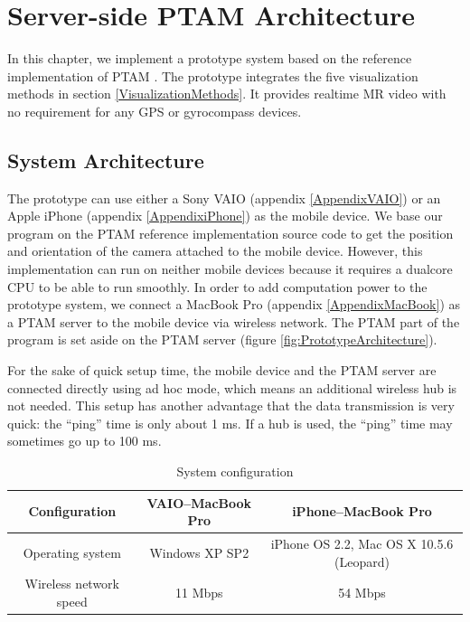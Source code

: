 \chapter{Server-side PTAM Architecture}
\label{Chapter3}

In this chapter, we implement a prototype system based on the reference implementation of PTAM \cite{Reference12}. The prototype integrates the five visualization methods in section \ref{VisualizationMethods}. It provides realtime MR video with no requirement for any GPS or gyrocompass devices.


\section{System Architecture}

The prototype can use either a Sony VAIO (appendix \ref{AppendixVAIO}) or an Apple iPhone (appendix \ref{AppendixiPhone}) as the mobile device. We base our program on the PTAM reference implementation source code \cite{Reference16} to get the position and orientation of the camera attached to the mobile device. However, this implementation can run on neither mobile devices because it requires a dualcore CPU to be able to run smoothly. In order to add computation power to the prototype system, we connect a MacBook Pro (appendix \ref{AppendixMacBook}) as a PTAM server to the mobile device via wireless network. The PTAM part of the program is set aside on the PTAM server (figure \ref{fig:PrototypeArchitecture}).

For the sake of quick setup time, the mobile device and the PTAM server are connected directly using ad hoc mode, which means an additional wireless hub is not needed. This setup has another advantage that the data transmission is very quick: the ``ping'' time is only about 1 ms. If a hub is used, the ``ping'' time may sometimes go up to 100 ms.

\begin{table}[tb]
	\begin{center}
		\caption{System configuration}
		\label{tb:SystemConfiguration}
		\begin{tabular}{|c|c|c|}
			\hline
			Configuration          & VAIO--MacBook Pro & iPhone--MacBook Pro                      \\
			\hline
			Operating system       & Windows XP SP2    & iPhone OS 2.2, Mac OS X 10.5.6 (Leopard) \\
			Wireless network speed & 11 Mbps           & 54 Mbps                                  \\
			\hline
		\end{tabular}
	\end{center}
\end{table}

